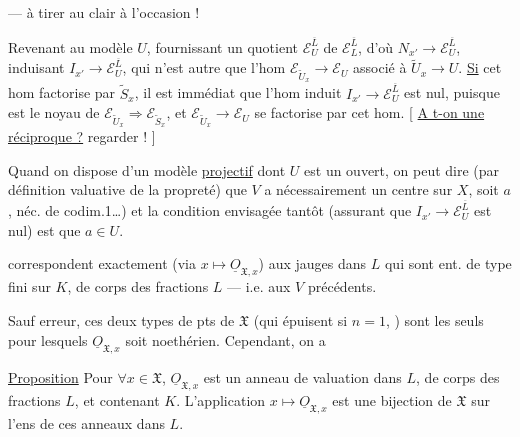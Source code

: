 
--- à tirer au clair à l'occasion !

Revenant au modèle $U$, fournissant
un quotient $\mathcal E_U^{\overline L}$ de $\mathcal E_L^{\overline L}$, d'où
$N_{x'}\longrightarrow\mathcal E_U^{\overline L}$, induisant $I_{x'}\longrightarrow\mathcal E_U^{\overline L}$,
qui n'est autre que l'hom \unsure{---} $\mathcal E_{\widetilde U_x}\longrightarrow\mathcal E_U$
associé à $\widetilde U_x\longrightarrow U$. \uline{Si} cet hom
factorise par $\widetilde S_x$, il est immédiat
que l'hom induit $I_{x'}\longrightarrow\mathcal E_U^{\overline L}$ est
nul, puisque  est le noyau de
$\mathcal E_{\widetilde U_x}\Longrightarrow\mathcal E_{\widetilde S_x}$, et $\mathcal E_{\widetilde U_x}\longrightarrow\mathcal E_U$ se factorise par
cet hom.
[ \uline{A t-on une réciproque ?} regarder ! ]

Quand on dispose d'un
modèle \uline{projectif} dont $U$ est un ouvert,
on peut dire (par définition valuative de
la propreté) que $V$ a nécessairement
un centre sur $X$, soit $a$,  
néc. de codim.1\ldots) et la condition
envisagée tantôt (assurant que $I_{x'}\longrightarrow
\mathcal E_U^{\overline L}$ est nul) est que $a\in U$.

correspondent exactement (via $x\longmapsto\underline{O}_{\mathfrak X,x}$) aux jauges dans $L$ qui sont ent. de type fini sur $K$, de corps des fractions $L$ --- i.e. aux $V$ précédents.

Sauf erreur, ces deux types de pts de $\mathfrak X$ (qui épuisent  si $n=1$,\unsure{)} ) sont les seuls pour lesquels $\underline{O}_{\mathfrak X,x}$ soit noethérien. Cependant, on a

\uline{Proposition} Pour $\forall x\in\mathfrak X$, $\underline{O}_{\mathfrak X,x}$ est un anneau de valuation dans $L$, de corps des fractions $L$, et contenant $K$. L'application $x\longmapsto\underline{O}_{\mathfrak X,x}$ est une bijection de $\mathfrak X$ sur l'ens de ces anneaux dans $L$.


